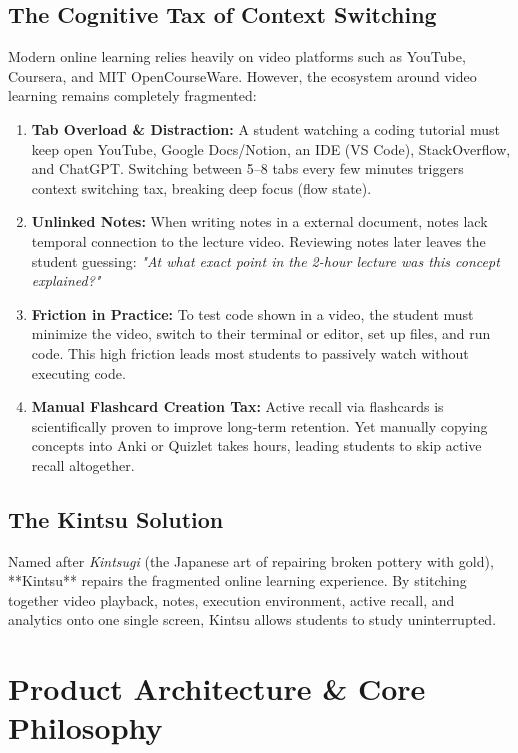 \documentclass[12pt,a4paper]{article}
\begin{document}
\subsection{The Cognitive Tax of Context Switching}
Modern online learning relies heavily on video platforms such as YouTube, Coursera, and MIT OpenCourseWare. However, the ecosystem around video learning remains completely fragmented:
\begin{enumerate}[leftmargin=1.5cm]
    \item \textbf{Tab Overload \& Distraction:} A student watching a coding tutorial must keep open YouTube, Google Docs/Notion, an IDE (VS Code), StackOverflow, and ChatGPT. Switching between 5--8 tabs every few minutes triggers context switching tax, breaking deep focus (flow state).
    \item \textbf{Unlinked Notes:} When writing notes in a external document, notes lack temporal connection to the lecture video. Reviewing notes later leaves the student guessing: \textit{"At what exact point in the 2-hour lecture was this concept explained?"}
    \item \textbf{Friction in Practice:} To test code shown in a video, the student must minimize the video, switch to their terminal or editor, set up files, and run code. This high friction leads most students to passively watch without executing code.
    \item \textbf{Manual Flashcard Creation Tax:} Active recall via flashcards is scientifically proven to improve long-term retention. Yet manually copying concepts into Anki or Quizlet takes hours, leading students to skip active recall altogether.
\end{enumerate}

\subsection{The Kintsu Solution}
Named after \textit{Kintsugi} (the Japanese art of repairing broken pottery with gold), **Kintsu** repairs the fragmented online learning experience. By stitching together video playback, notes, execution environment, active recall, and analytics onto one single screen, Kintsu allows students to study uninterrupted.

\section{Product Architecture \& Core Philosophy}
\end{document}
